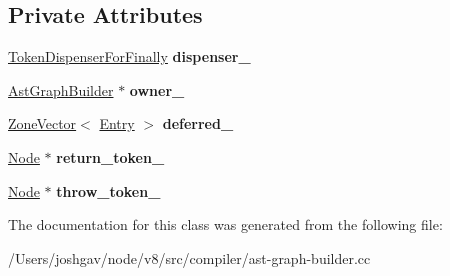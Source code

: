 \subsection*{Private Attributes}
\begin{DoxyCompactItemize}
\item 
\hyperlink{classv8_1_1internal_1_1_token_dispenser_for_finally}{Token\+Dispenser\+For\+Finally} {\bfseries dispenser\+\_\+}\hypertarget{classv8_1_1internal_1_1compiler_1_1_ast_graph_builder_1_1_control_scope_1_1_deferred_commands_a8d066ecadd8b595fd915893560fe3e48}{}\label{classv8_1_1internal_1_1compiler_1_1_ast_graph_builder_1_1_control_scope_1_1_deferred_commands_a8d066ecadd8b595fd915893560fe3e48}

\item 
\hyperlink{classv8_1_1internal_1_1compiler_1_1_ast_graph_builder}{Ast\+Graph\+Builder} $\ast$ {\bfseries owner\+\_\+}\hypertarget{classv8_1_1internal_1_1compiler_1_1_ast_graph_builder_1_1_control_scope_1_1_deferred_commands_a56cb671c36f97ecf95cf130868ebad47}{}\label{classv8_1_1internal_1_1compiler_1_1_ast_graph_builder_1_1_control_scope_1_1_deferred_commands_a56cb671c36f97ecf95cf130868ebad47}

\item 
\hyperlink{classv8_1_1internal_1_1_zone_vector}{Zone\+Vector}$<$ \hyperlink{structv8_1_1internal_1_1compiler_1_1_ast_graph_builder_1_1_control_scope_1_1_deferred_commands_1_1_entry}{Entry} $>$ {\bfseries deferred\+\_\+}\hypertarget{classv8_1_1internal_1_1compiler_1_1_ast_graph_builder_1_1_control_scope_1_1_deferred_commands_a27dd30fb1abe3386f370788023306c7f}{}\label{classv8_1_1internal_1_1compiler_1_1_ast_graph_builder_1_1_control_scope_1_1_deferred_commands_a27dd30fb1abe3386f370788023306c7f}

\item 
\hyperlink{classv8_1_1internal_1_1compiler_1_1_node}{Node} $\ast$ {\bfseries return\+\_\+token\+\_\+}\hypertarget{classv8_1_1internal_1_1compiler_1_1_ast_graph_builder_1_1_control_scope_1_1_deferred_commands_a5bfab363ce627b33bf5fc5fa8c8d29ee}{}\label{classv8_1_1internal_1_1compiler_1_1_ast_graph_builder_1_1_control_scope_1_1_deferred_commands_a5bfab363ce627b33bf5fc5fa8c8d29ee}

\item 
\hyperlink{classv8_1_1internal_1_1compiler_1_1_node}{Node} $\ast$ {\bfseries throw\+\_\+token\+\_\+}\hypertarget{classv8_1_1internal_1_1compiler_1_1_ast_graph_builder_1_1_control_scope_1_1_deferred_commands_a3304131ff595ac8a9a3d30c0ab53d553}{}\label{classv8_1_1internal_1_1compiler_1_1_ast_graph_builder_1_1_control_scope_1_1_deferred_commands_a3304131ff595ac8a9a3d30c0ab53d553}

\end{DoxyCompactItemize}


The documentation for this class was generated from the following file\+:\begin{DoxyCompactItemize}
\item 
/\+Users/joshgav/node/v8/src/compiler/ast-\/graph-\/builder.\+cc\end{DoxyCompactItemize}
